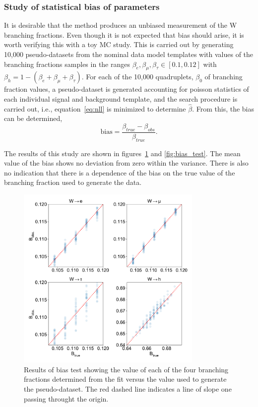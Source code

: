 \subsubsection{Study of statistical bias of parameters}

It is desirable that the method produces an unbiased measurement of the
W branching fractions.  Even though it is not expected that bias should
arise, it is worth verifying this with a toy MC study.  This is carried
out by generating 10,000 pseudo-datasets from the nominal data model
templates with values of the branching fractions samples in the ranges
$\beta_{e}, \beta_{\mu}, \beta_{\tau} \in [0.1, 0.12]$ with $\beta_{h} =
1 - (\beta_{e} + \beta_{\mu} + \beta_{\tau})$.  For each of the 10,000
quadruplets, $\beta_{0}$ of branching fraction values, a pseudo-dataset
is generated accounting for poisson statistics of each individual signal
and background template, and the search procedure is carried out, i.e.,
equation~\ref{eq:nll} is minimized to determine $\hat{\beta}$.  From
this, the bias can be determined,
\begin{equation}
\label{eq:bias}
    \mathrm{bias} = \frac{\beta_{true} - \beta_{obs}}{\beta_{true}}.
\end{equation}

The results of this study are shown in figures~\ref{fig:bias_scan} and
\ref{fig:bias_test}.  The mean value of the bias shows no deviation from
zero within the variance.  There is also no indication that there is
a dependence of the bias on the true value of the branching fraction
used to generate the data.

\begin{figure}[htb!]
    \centering
    \includegraphics[width=0.8\textwidth]{chapters/Analysis/sectionStatisticalAnalysis/figures/beta_scan}
    \caption{Results of bias test showing the value of each of the four
    branching fractions determined from the fit versus the value used to
    generate the pseudo-dataset.  The red dashed line indicates a line
    of slope one passing throught the origin.}
    \label{fig:bias_scan}
\end{figure}

